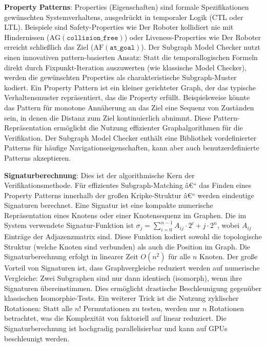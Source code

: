 ﻿\documentclass[a4paper,12pt]{article}
\theoremstyle{definition}
\begin{document}
\textbf{Property Patterns}: Properties (Eigenschaften) sind formale Spezifikationen gewün\-schten Systemverhaltens, ausgedrückt in temporaler Logik (CTL oder LTL). Beispiele sind Safety-Properties wie Der Roboter kollidiert nie mit Hindernissen ($\text{AG}(\texttt{collision\_free})$) oder Liveness-Properties wie Der Roboter erreicht schließlich das Ziel ($\text{AF}(\texttt{at\_goal})$). Der Subgraph Model Checker nutzt einen innovativen pattern-basierten Ansatz: Statt die temporallogischen Formeln direkt durch Fixpunkt-Iteration auszuwerten (wie klassische Model Checker), werden die gewünschten Properties als charakteristische Subgraph-Muster kodiert. Ein Property Pattern ist ein kleiner gerichteter Graph, der das typische Verhaltensmuster repräsentiert, das die Property erfüllt. Beispielsweise könnte das Pattern für monotone Annäherung an das Ziel eine Sequenz von Zuständen sein, in denen die Distanz zum Ziel kontinuierlich abnimmt. Diese Pattern-Repräsentation ermöglicht die Nutzung effizienter Graphalgorithmen für die Verifikation. Der Subgraph Model Checker enthält eine Bibliothek vordefinierter Patterns für häufige Navigationseigenschaften, kann aber auch benutzerdefinierte Patterns akzeptieren.

\textbf{Signaturberechnung}: Dies ist der algorithmische Kern der Verifikationsmethode. Für effizientes Subgraph-Matching â€“ das Finden eines Property Patterns innerhalb der großen Kripke-Struktur â€“ werden eindeutige Signaturen berechnet. Eine Signatur ist eine kompakte numerische Repräsentation eines Knotens oder einer Knotensequenz im Graphen. Die im System verwendete Signatur-Funktion ist $\sigma_j = \sum_{i=0}^{n-1} A_{ij} \cdot 2^i + j \cdot 2^n$, wobei $A_{ij}$ Einträge der Adjazenzmatrix sind. Diese Funktion kodiert sowohl die topologische Struktur (welche Knoten sind verbunden) als auch die Position im Graph. Die Signaturberechnung erfolgt in linearer Zeit $O(n^2)$ für alle $n$ Knoten. Der große Vorteil von Signaturen ist, dass Graphvergleiche reduziert werden auf numerische Vergleiche: Zwei Subgraphen sind nur dann identisch (isomorph), wenn ihre Signaturen übereinstimmen. Dies ermöglicht drastische Beschleunigung gegenüber klassischen Isomorphie-Tests. Ein weiterer Trick ist die Nutzung zyklischer Rotationen: Statt alle $n!$ Permutationen zu testen, werden nur $n$ Rotationen betrachtet, was die Komplexität von faktoriell auf linear reduziert. Die Signaturberechnung ist hochgradig parallelisierbar und kann auf GPUs beschleunigt werden.
\end{document}
